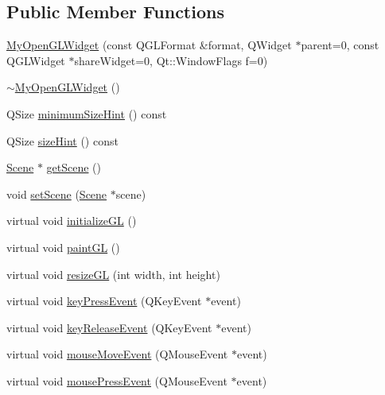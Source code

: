 \subsection*{Public Member Functions}
\begin{DoxyCompactItemize}
\item 
\hyperlink{class_my_open_g_l_widget_af7d9636f7607ea575f0742d64366b87b}{My\+Open\+G\+L\+Widget} (const Q\+G\+L\+Format \&format, Q\+Widget $\ast$parent=0, const Q\+G\+L\+Widget $\ast$share\+Widget=0, Qt\+::\+Window\+Flags f=0)
\item 
\hyperlink{class_my_open_g_l_widget_aa9bdb4eb867d9e0bbfab210732fa5883}{$\sim$\+My\+Open\+G\+L\+Widget} ()
\item 
Q\+Size \hyperlink{class_my_open_g_l_widget_a4a037578f8e21a015e7b2915992fbe5d}{minimum\+Size\+Hint} () const 
\item 
Q\+Size \hyperlink{class_my_open_g_l_widget_abacca5d710f6a81b5edfd164f0148ed6}{size\+Hint} () const 
\item 
\hyperlink{class_scene}{Scene} $\ast$ \hyperlink{class_my_open_g_l_widget_ab25f238721b8e1cba36c2a0350ac57ba}{get\+Scene} ()
\item 
void \hyperlink{class_my_open_g_l_widget_aaac5737e9ce05a94006aa92afed5d403}{set\+Scene} (\hyperlink{class_scene}{Scene} $\ast$scene)
\item 
virtual void \hyperlink{class_my_open_g_l_widget_a98597f5669cec1c90f36c1d38569afc5}{initialize\+G\+L} ()
\item 
virtual void \hyperlink{class_my_open_g_l_widget_af7babfe769e968c317e646c4387b357d}{paint\+G\+L} ()
\item 
virtual void \hyperlink{class_my_open_g_l_widget_a51847d078dbd11fb99335abbc5eaf4fc}{resize\+G\+L} (int width, int height)
\item 
virtual void \hyperlink{class_my_open_g_l_widget_a87a479700547c066721b4b3532b040a2}{key\+Press\+Event} (Q\+Key\+Event $\ast$event)
\item 
virtual void \hyperlink{class_my_open_g_l_widget_a57e054ac1c21ed8585ca57b151ec6b38}{key\+Release\+Event} (Q\+Key\+Event $\ast$event)
\item 
virtual void \hyperlink{class_my_open_g_l_widget_a27abe02c04240317cf42c1cec1ac7e25}{mouse\+Move\+Event} (Q\+Mouse\+Event $\ast$event)
\item 
virtual void \hyperlink{class_my_open_g_l_widget_a6a2e229f91bb75775bb539c85bb696ef}{mouse\+Press\+Event} (Q\+Mouse\+Event $\ast$event)
\end{DoxyCompactItemize}
